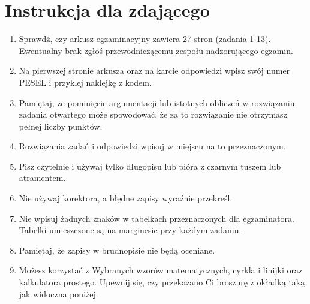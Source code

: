 \documentclass[10pt]{article}
\begin{document}
\section*{Instrukcja dla zdającego}
\begin{enumerate}
  \item Sprawdź, czy arkusz egzaminacyjny zawiera 27 stron (zadania 1-13). Ewentualny brak zgłoś przewodniczącemu zespołu nadzorującego egzamin.
  \item Na pierwszej stronie arkusza oraz na karcie odpowiedzi wpisz swój numer PESEL i przyklej naklejkę z kodem.
  \item Pamiętaj, że pominięcie argumentacji lub istotnych obliczeń w rozwiązaniu zadania otwartego może spowodować, że za to rozwiązanie nie otrzymasz pełnej liczby punktów.
  \item Rozwiązania zadań i odpowiedzi wpisuj w miejscu na to przeznaczonym.
  \item Pisz czytelnie i używaj tylko długopisu lub pióra z czarnym tuszem lub atramentem.
  \item Nie używaj korektora, a błędne zapisy wyraźnie przekreśl.
  \item Nie wpisuj żadnych znaków w tabelkach przeznaczonych dla egzaminatora. Tabelki umieszczone są na marginesie przy każdym zadaniu.
  \item Pamiętaj, że zapisy w brudnopisie nie będą oceniane.
  \item Możesz korzystać z Wybranych wzorów matematycznych, cyrkla i linijki oraz kalkulatora prostego. Upewnij się, czy przekazano Ci broszurę z okładką taką jak widoczna poniżej.\\

\end{enumerate}
\end{document}
